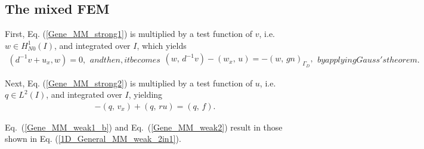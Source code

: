 \documentclass[review,3p]{elsarticle}
\begin{document}
\subsection{The mixed FEM}		\label{derivation_weak_form_MM}
First, Eq. (\ref{Gene_MM_strong1}) is multiplied by a test function of $v$, i.e. $w \in H _{N0}^{1}(I)$, and integrated over $I$, which yields
\begin{subequations}
\begin{align}
  ( d^{-1}v + u _x, w) = 0,	\label{Gene_MM_weak1_a}
\end{align}
and then, it becomes
\begin{align}
 (w, \, d^{-1}v) - (w_x, \,  u ) = -(w, \, g n)_{\Gamma_D},		\label{Gene_MM_weak1_b}
\end{align}				\label{Gene_MM_weak1}%
by applying Gauss's theorem.
\end{subequations}

Next, Eq. (\ref{Gene_MM_strong2}) is multiplied by a test function of $u$, i.e. $q \in L^2 (I)$, and integrated over $I$, yielding 
\begin{align}
- ( q , \, v_x) + (q, \, ru) = (q, \, f ). \label{Gene_MM_weak2}
\end{align}

Eq.~(\ref{Gene_MM_weak1_b}) and Eq.~({\ref{Gene_MM_weak2}}) result in those shown in Eq. (\ref{1D_General_MM_weak_2in1}).

\newpage

  
\end{document}
